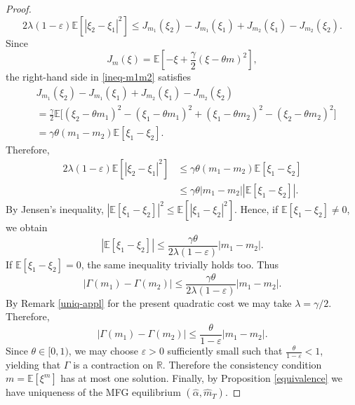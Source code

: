 \documentclass[11pt,a4paper]{article}
\begin{document}
\begin{proof}
\begin{equation}
2\lambda (1-\varepsilon)\mathbb E \left[|\xi_2-\xi_1|^2 \right]\le
J_{m_1}(\xi_2)-J_{m_1}(\xi_1)+J_{m_2}(\xi_1)-J_{m_2}(\xi_2).
\end{equation}
Since
\[
J_m(\xi)=\mathbb E\left[-\xi+\frac{\gamma}{2}(\xi-\theta m)^2\right],
\]
the right-hand side in \eqref{ineq-m1m2} satisfies
\[
\begin{aligned}
&J_{m_1}(\xi_2)-J_{m_1}(\xi_1)+J_{m_2}(\xi_1)-J_{m_2}(\xi_2) \\
&=\frac{\gamma}{2}\mathbb E\Big[(\xi_2-\theta m_1)^2-(\xi_1-\theta m_1)^2+(\xi_1-\theta m_2)^2-(\xi_2-\theta m_2)^2\Big]\\
&=\gamma\theta(m_1-m_2)\mathbb E[\xi_1-\xi_2].
\end{aligned}
\]
Therefore,
\begin{align*}
2\lambda (1-\varepsilon)\mathbb E \left[|\xi_2-\xi_1|^2 \right] & \le \gamma\theta(m_1-m_2)\mathbb E[\xi_1-\xi_2]\\
& \le \gamma\theta |m_1-m_2|\left|\mathbb E[\xi_1-\xi_2]\right|.
\end{align*}
By Jensen's inequality,
$\left|\mathbb E[\xi_1-\xi_2]\right|^2 \le \mathbb E\left[|\xi_1-\xi_2|^2\right]$.
Hence, if \(\mathbb E[\xi_1-\xi_2]\neq0\), we obtain
\[
\left|\mathbb E[\xi_1-\xi_2]\right| \le\frac{\gamma\theta}{2\lambda(1-\varepsilon)}|m_1-m_2|.
\]
If \(\mathbb E[\xi_1-\xi_2]=0\), the same inequality trivially holds too. Thus
\[
|\Gamma(m_1)-\Gamma(m_2)|\le\frac{\gamma\theta}{2\lambda(1-\varepsilon)}|m_1-m_2|.
\]
By Remark \ref{uniq-appl}  for the present quadratic cost we may take \(\lambda=\gamma/2\). Therefore,
\[
|\Gamma(m_1)-\Gamma(m_2)| \le \frac{\theta}{1-\varepsilon} |m_1-m_2|.
\]
Since \(\theta\in[0,1)\), we may choose \(\varepsilon>0\) sufficiently small such that $\frac{\theta}{1-\varepsilon}<1$, yielding that \(\Gamma\) is a contraction on \(\mathbb R\). Therefore the consistency condition
$m=\mathbb E[\xi^m]$
has at most one solution. Finally, by Proposition \ref{equivalence} we have  uniqueness of the MFG equilibrium $(\hat \alpha, \hat m_T)$.
\end{proof}
\end{document}

